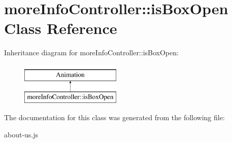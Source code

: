 \hypertarget{classmoreInfoController_1_1isBoxOpen}{\section{more\-Info\-Controller\-:\-:is\-Box\-Open Class Reference}
\label{classmoreInfoController_1_1isBoxOpen}
}
Inheritance diagram for more\-Info\-Controller\-:\-:is\-Box\-Open\-:\begin{figure}[H]
\begin{center}
\leavevmode
\includegraphics[height=2.000000cm]{classmoreInfoController_1_1isBoxOpen}
\end{center}
\end{figure}


The documentation for this class was generated from the following file\-:\begin{DoxyCompactItemize}
\item 
about-\/us.\-js\end{DoxyCompactItemize}
